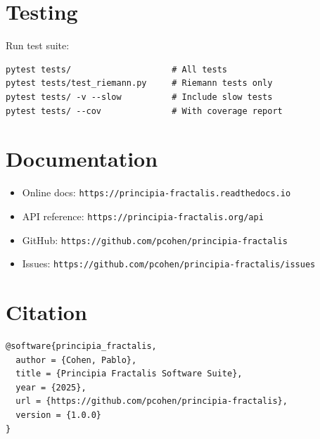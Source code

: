 \section{Testing}

Run test suite:

\begin{verbatim}
pytest tests/                    # All tests
pytest tests/test_riemann.py     # Riemann tests only
pytest tests/ -v --slow          # Include slow tests
pytest tests/ --cov              # With coverage report
\end{verbatim}

\section{Documentation}

\begin{itemize}
\item Online docs: \texttt{https://principia-fractalis.readthedocs.io}
\item API reference: \texttt{https://principia-fractalis.org/api}
\item GitHub: \texttt{https://github.com/pcohen/principia-fractalis}
\item Issues: \texttt{https://github.com/pcohen/principia-fractalis/issues}
\end{itemize}

\section{Citation}

\begin{verbatim}
@software{principia_fractalis,
  author = {Cohen, Pablo},
  title = {Principia Fractalis Software Suite},
  year = {2025},
  url = {https://github.com/pcohen/principia-fractalis},
  version = {1.0.0}
}
\end{verbatim}